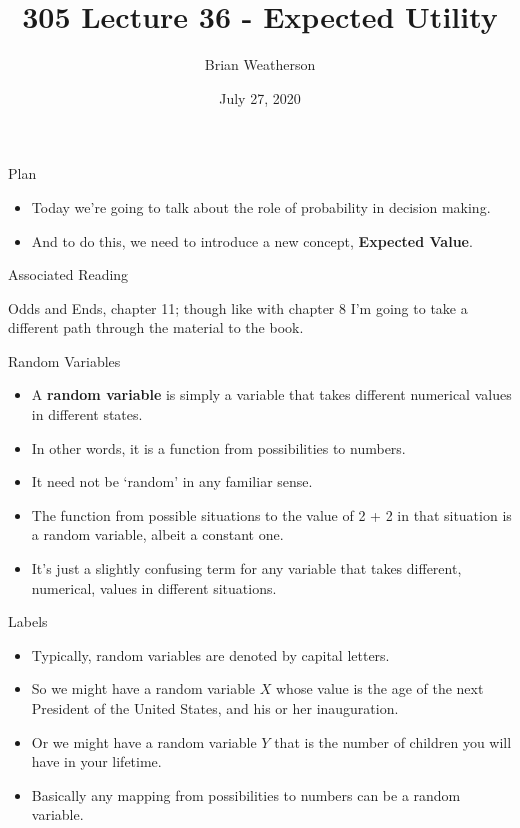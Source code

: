 \documentclass[
  ignorenonframetext,
]{beamer}
\title{305 Lecture 36 - Expected Utility}
\author{Brian Weatherson}
\date{July 27, 2020}
\providecommand{\tightlist}{%
  \setlength{\itemsep}{0pt}\setlength{\parskip}{0pt}}
\renewcommand{\,}{\text{, }}
\begin{document}
\frame{\titlepage}

\begin{frame}{Plan}
\protect\hypertarget{plan}{}

\begin{itemize}
\tightlist
\item
  Today we're going to talk about the role of probability in decision
  making.
\item
  And to do this, we need to introduce a new concept, \textbf{Expected
  Value}.
\end{itemize}

\end{frame}

\begin{frame}{Associated Reading}
\protect\hypertarget{associated-reading}{}

Odds and Ends, chapter 11; though like with chapter 8 I'm going to take
a different path through the material to the book.

\end{frame}

\begin{frame}{Random Variables}
\protect\hypertarget{random-variables}{}

\begin{itemize}
\tightlist
\item
  A \textbf{random variable} is simply a variable that takes different
  numerical values in different states.
\item
  In other words, it is a function from possibilities to numbers.
\item
  It need not be `random' in any familiar sense.
\item
  The function from possible situations to the value of 2 + 2 in that
  situation is a random variable, albeit a constant one.
\item
  It's just a slightly confusing term for any variable that takes
  different, numerical, values in different situations.
\end{itemize}

\end{frame}

\begin{frame}{Labels}
\protect\hypertarget{labels}{}

\begin{itemize}
\tightlist
\item
  Typically, random variables are denoted by capital letters.
\item
  So we might have a random variable \(X\) whose value is the age of the
  next President of the United States, and his or her inauguration.
\item
  Or we might have a random variable \(Y\) that is the number of
  children you will have in your lifetime.
\item
  Basically any mapping from possibilities to numbers can be a random
  variable.
\end{itemize}

\end{frame}
\end{document}
